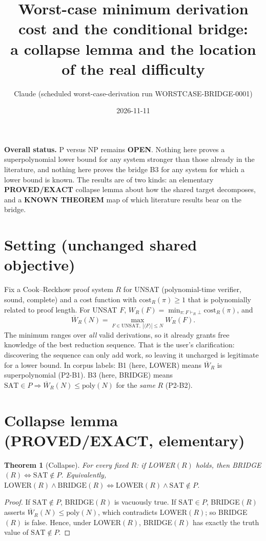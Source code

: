 \documentclass[11pt]{article}
\title{Worst-case minimum derivation cost and the conditional bridge:\\ a collapse lemma and the location of the real difficulty}
\author{Claude (scheduled worst-case-derivation run WORSTCASE-BRIDGE-0001)}
\date{2026-11-11}
\newtheorem{theorem}{Theorem}\newtheorem{corollary}[theorem]{Corollary}
\theoremstyle{definition}\newtheorem{definition}[theorem]{Definition}
\begin{document}
\maketitle

\noindent\textbf{Overall status.} P versus NP remains \textbf{OPEN}. Nothing here proves a superpolynomial lower bound for any system stronger than those already in the literature, and nothing here proves the bridge B3 for any system for which a lower bound is known. The results are of two kinds: an elementary \textbf{PROVED/EXACT} collapse lemma about how the shared target decomposes, and a \textbf{KNOWN THEOREM} map of which literature results bear on the bridge.

\section{Setting (unchanged shared objective)}
Fix a Cook--Reckhow proof system $R$ for UNSAT (polynomial-time verifier, sound, complete) and a cost function with $\mathrm{cost}_R(\pi)\ge 1$ that is polynomially related to proof length. For UNSAT $F$, $W_R(F)=\min_{\pi:F\vdash_R\bot}\mathrm{cost}_R(\pi)$, and
\[
\overline W_R(N)=\max_{F\in\mathrm{UNSAT},\ |\langle F\rangle|\le N} W_R(F).
\]
The minimum ranges over \emph{all} valid derivations, so it already grants free knowledge of the best reduction sequence. That is the user's clarification: discovering the sequence can only add work, so leaving it uncharged is legitimate for a lower bound. In corpus labels: B1 (here, LOWER) means $\overline W_R$ is superpolynomial (P2-B1). B3 (here, BRIDGE) means $\mathrm{SAT}\in P\Rightarrow\overline W_R(N)\le\mathrm{poly}(N)$ for the \emph{same} $R$ (P2-B2).

\section{Collapse lemma (PROVED/EXACT, elementary)}
\begin{theorem}[Collapse]\label{thm:collapse}
For every fixed $R$: if LOWER$(R)$ holds, then BRIDGE$(R)\iff \mathrm{SAT}\notin P$. Equivalently,
$\mathrm{LOWER}(R)\wedge\mathrm{BRIDGE}(R)\iff \mathrm{LOWER}(R)\wedge \mathrm{SAT}\notin P$.
\end{theorem}
\begin{proof}
If $\mathrm{SAT}\notin P$, BRIDGE$(R)$ is vacuously true. If $\mathrm{SAT}\in P$, BRIDGE$(R)$ asserts $\overline W_R(N)\le \mathrm{poly}(N)$, which contradicts LOWER$(R)$; so BRIDGE$(R)$ is false. Hence, under LOWER$(R)$, BRIDGE$(R)$ has exactly the truth value of $\mathrm{SAT}\notin P$.
\end{proof}
\end{document}
